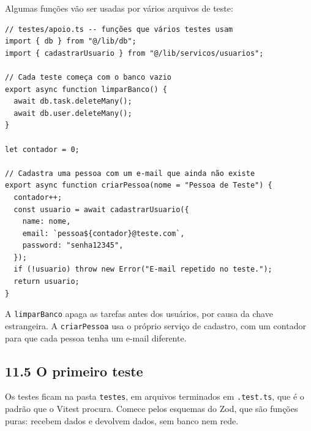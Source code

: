Algumas funções vão ser usadas por vários arquivos de teste:

\begin{codigo}
\begin{Verbatim}[breaklines=true, breaksymbolleft={}, fontsize=\footnotesize]
// testes/apoio.ts -- funções que vários testes usam
import { db } from "@/lib/db";
import { cadastrarUsuario } from "@/lib/servicos/usuarios";

// Cada teste começa com o banco vazio
export async function limparBanco() {
  await db.task.deleteMany();
  await db.user.deleteMany();
}

let contador = 0;

// Cadastra uma pessoa com um e-mail que ainda não existe
export async function criarPessoa(nome = "Pessoa de Teste") {
  contador++;
  const usuario = await cadastrarUsuario({
    name: nome,
    email: `pessoa${contador}@teste.com`,
    password: "senha12345",
  });
  if (!usuario) throw new Error("E-mail repetido no teste.");
  return usuario;
}
\end{Verbatim}
\end{codigo}

A \texttt{limparBanco} apaga as tarefas antes dos usuários, por causa da chave estrangeira. A \texttt{criarPessoa} usa o próprio serviço de cadastro, com um contador para que cada pessoa tenha um e-mail diferente.

\subsection{11.5 O primeiro teste}

Os testes ficam na pasta \texttt{testes}, em arquivos terminados em \texttt{.test.ts}, que é o padrão que o Vitest procura. Comece pelos esquemas do Zod, que são funções puras: recebem dados e devolvem dados, sem banco nem rede.


